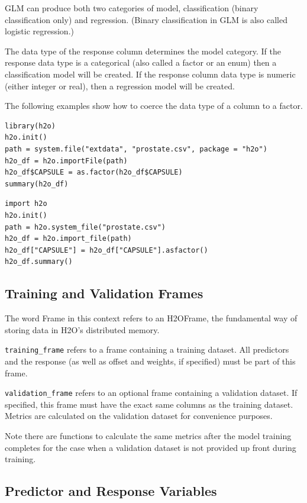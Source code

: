 GLM can produce both two categories of model, classification (binary classification only) and regression.  (Binary
classification in GLM is also called logistic regression.)

The data type of the response column determines the model category.  If the response data type is a categorical
(also called a factor or an enum) then a classification model will be created.  If the response column data type is
numeric (either integer or real), then a regression model will be created.

The following examples show how to coerce the data type of a column to a factor.

\bigskip
\waterExampleInR
\begin{lstlisting}[style=R]
library(h2o)
h2o.init()
path = system.file("extdata", "prostate.csv", package = "h2o")
h2o_df = h2o.importFile(path)
h2o_df$CAPSULE = as.factor(h2o_df$CAPSULE)
summary(h2o_df)
\end{lstlisting}

\waterExampleInPython
\begin{lstlisting}[style=python]
import h2o
h2o.init()
path = h2o.system_file("prostate.csv")
h2o_df = h2o.import_file(path)
h2o_df["CAPSULE"] = h2o_df["CAPSULE"].asfactor()
h2o_df.summary()
\end{lstlisting}

\subsection{Training and Validation Frames}

The word Frame in this context refers to an H2OFrame, the fundamental way of storing data in H2O's distributed memory.

\texttt{training\_frame} refers to a frame containing a training dataset.  All predictors and the response (as
well as offset and weights, if specified) must be part of this frame.

\texttt{validation\_frame} refers to an optional frame containing a validation dataset.  If specified, this 
frame must have the exact same columns as the training dataset.  Metrics are calculated on the validation dataset
for convenience purposes.

Note there are functions to calculate the same metrics after the model training completes for the case when a
validation dataset is not provided up front during training.

\subsection{Predictor and Response Variables}

